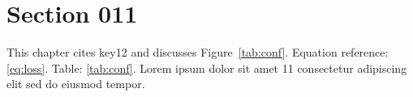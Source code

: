 \section{Section 011}\label{sec:s11}
This chapter cites key12 and discusses Figure~\ref{tab:conf}.
Equation reference: \eqref{eq:loss}. Table: \ref{tab:conf}.
Lorem ipsum dolor sit amet 11 consectetur adipiscing elit sed do eiusmod tempor.
